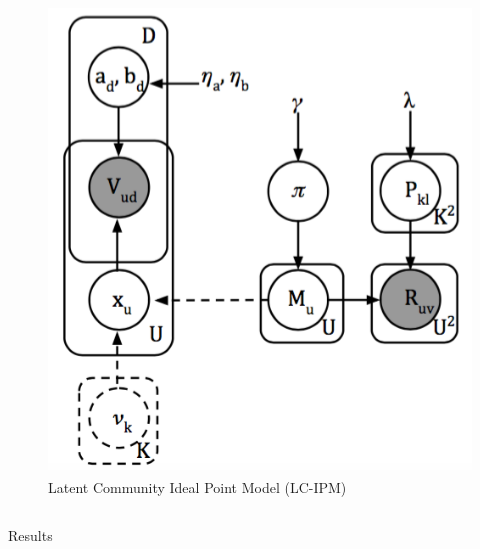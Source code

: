 \documentclass[final]{beamer}
\newlength{\onecolwid}
\newlength{\twocolwid}
\begin{document}
\begin{frame}[t]
\begin{columns}[t]
\begin{column}{\twocolwid}
\begin{columns}[t,totalwidth=\twocolwid]
\begin{column}{\onecolwid}
\begin{figure}
\includegraphics[width=.9\linewidth]{lcipm2.png}
\caption{{\selectfont Latent Community Ideal Point Model (LC-IPM)}}
\end{figure}


\end{column} %

\end{columns} %



\begin{block}{Results}


\end{block}
\end{column}
\end{columns}
\end{frame}
\end{document}
